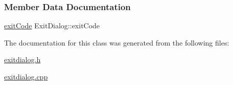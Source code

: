 \subsubsection{Member Data Documentation}
\mbox{\label{classExitDialog_adff4059e3ad467576437361b8f8518c0}} 
{\footnotesize\ttfamily \mbox{\hyperlink{classExitDialog_a750dfbbef3dec32bec821122ee7b910c}{\texorpdfstring{exit\+Code}{exitCode}}} Exit\+Dialog\+::exit\+Code{\ttfamily [private]}} 

The documentation for this class was generated from the following files\+:\begin{DoxyCompactItemize}
\item 
\mbox{\hyperlink{exitdialog_8h}{exitdialog.\+h}}\item 
\mbox{\hyperlink{exitdialog_8cpp}{exitdialog.\+cpp}}\end{DoxyCompactItemize}
\newpage